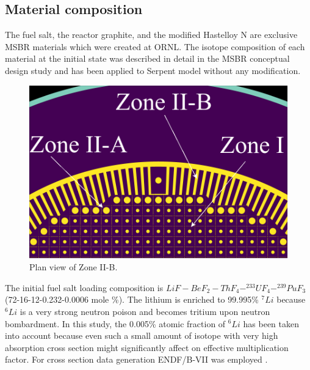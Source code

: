 \documentclass{anstrans}
\begin{document}
\subsection{Material composition}
The fuel salt, the reactor graphite, and the modified Hastelloy N are exclusive MSBR materials which were created at ORNL. The isotope composition of each material at the initial state was described in detail in the MSBR conceptual design study \cite{robertson_conceptual_1971} and has been applied to Serpent model without any modification. 

\begin{figure}[hb] %
  \centering
  \includegraphics[width=0.93\linewidth]{figure_2_5.png}
  \caption{Plan view of Zone II-B.}
  \label{fig:zone2B}
\end{figure}

The initial fuel salt loading composition is $LiF-BeF_2-ThF_4-^{233}UF_4-^{239}PuF_3$ (72-16-12-0.232-0.0006 mole \%). The lithium is enriched to 99.995\% $^{7}Li$ because $^{6}Li$ is a very strong neutron poison and becomes tritium upon neutron bombardment. In this study, the 0.005\% atomic fraction of $^{6}Li$ has been taken into account because even such a small amount of isotope with very high absorption cross section might significantly affect on effective multiplication factor. For cross section data generation ENDF/B-VII was employed \cite{chadwick_endf/b-vii.0:_2006}. %

\end{document}

